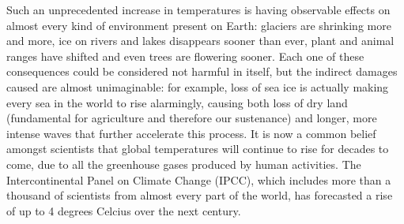 \documentclass[11pt,a4paper,titlepage]{book}
\begin{document}
Such an unprecedented increase in temperatures is having observable effects on almost every kind of environment present on Earth: glaciers are shrinking more and more, ice on rivers and lakes disappears sooner than ever, plant and animal ranges have shifted  and even trees are flowering sooner.
\newline
Each one of these consequences could be considered not harmful in itself, but the indirect damages caused are almost unimaginable: for example, loss of sea ice is actually making every sea in the world to rise alarmingly, causing both loss of dry land (fundamental for agriculture and therefore our sustenance) and longer, more intense waves that further accelerate this process.
\newline
\newline
It is now a common belief amongst scientists that global temperatures will continue to rise for decades to come, due to all the greenhouse gases produced by human activities. The Intercontinental Panel on Climate Change (IPCC), which includes more than a thousand of scientists from almost every part of the world, has forecasted a rise of up to 4 degrees Celcius over the next century.
\end{document}
